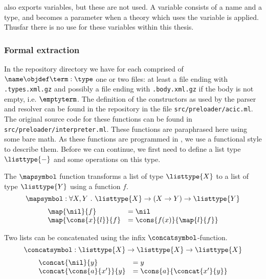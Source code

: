\coq also exports variables, but these are not used.
A variable consists of a name and a type, and becomes a parameter when a theory which uses the variable is applied.
Thusfar there is no use for these variables within this thesis.

\subsubsection{Formal extraction}
In the repository \xml directory we have for each \coqobj[s] comprised of $\name \objdef \term : \type$
one or two files: at least a file ending with \lstinline{.types.xml.gz} and
possibly a file ending with \lstinline{.body.xml.gz} if the body is not empty, i.e. $\emptyterm$.
The definition of the constructors as used by the parser and resolver can be found
in the \roerei repository in the file \lstinline{src/preloader/acic.ml}.
The original source code for these functions can be found in \lstinline{src/preloader/interpreter.ml}.
These functions are paraphrased here using some bare math.
As these functions are programmed in \ocaml, we use a functional style to describe them.
Before we can continue, we first need to define a list type $\listtype{-}$ and some operations on this type.

\begin{definition}[\mapsymbol]
  The $\mapsymbol$ function transforms a list of type $\listtype{X}$ to a list of type $\listtype{Y}$ using a function $f$.
  \[ \mapsymbol : \forall X, Y ~.~ \listtype{X} \rightarrow (X \rightarrow Y) \rightarrow \listtype{Y} \]
  \[ \begin{array}{ll}
      \map{\nil}{f} & = \nil \\
      \map{\cons{x}{l}}{f} & = \cons{f(x)}{\map{l}{f}} \\
    \end{array} \]
\end{definition}

\begin{definition}[\concatsymbol]
  Two lists can be concatenated using the infix $\concatsymbol$-function.
  \[ \concatsymbol : \listtype{X} \rightarrow \listtype{X} \rightarrow \listtype{X} \]
  \[ \begin{array}{ll}
      \concat{\nil}{y} & = y \\
      \concat{\cons{a}{x'}}{y} & = \cons{a}{\concat{x'}{y}} \\
    \end{array} \]
\end{definition}

